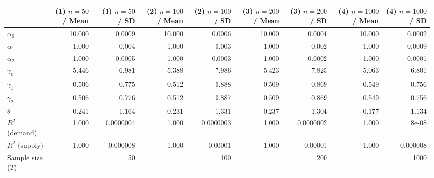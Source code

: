 
\begin{tabular}[t]{lrrrrrrrr}
\toprule
  & (1) $n=50$ / Mean & (1) $n=50$ / SD & (2) $n=100$ / Mean & (2) $n=100$ / SD & (3) $n=200$ / Mean & (3) $n=200$ / SD & (4) $n=1000$ / Mean & (4) $n=1000$ / SD\\
\midrule
$\alpha_{0}$ & 10.000 & 0.0009 & 10.000 & 0.0006 & 10.000 & 0.0004 & 10.000 & 0.0002\\
$\alpha_{1}$ & 1.000 & 0.004 & 1.000 & 0.003 & 1.000 & 0.002 & 1.000 & 0.0009\\
$\alpha_{2}$ & 1.000 & 0.0005 & 1.000 & 0.0003 & 1.000 & 0.0002 & 1.000 & 0.0001\\
$\gamma_{0}$ & 5.446 & 6.981 & 5.388 & 7.986 & 5.423 & 7.825 & 5.063 & 6.801\\
$\gamma_{1}$ & 0.506 & 0.775 & 0.512 & 0.888 & 0.509 & 0.869 & 0.549 & 0.756\\
$\gamma_{2}$ & 0.506 & 0.776 & 0.512 & 0.887 & 0.509 & 0.869 & 0.549 & 0.756\\
$\theta$ & -0.241 & 1.164 & -0.231 & 1.331 & -0.237 & 1.304 & -0.177 & 1.134\\
$R^{2}$ (demand) & 1.000 & 0.0000004 & 1.000 & 0.0000003 & 1.000 & 0.0000002 & 1.000 & 8e-08\\
$R^{2}$ (supply) & 1.000 & 0.000008 & 1.000 & 0.00001 & 1.000 & 0.00001 & 1.000 & 0.000008\\
Sample size ($T$) &  & 50 &  & 100 &  & 200 &  & 1000\\
\bottomrule
\end{tabular}
